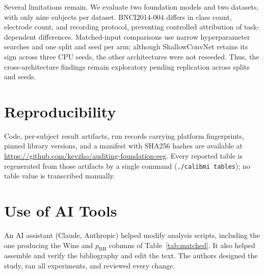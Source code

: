 \documentclass[conference]{IEEEtran}
\begin{document}
Several limitations remain. We evaluate two foundation models and two datasets, with only nine subjects per dataset. BNCI2014-004 differs in class count, electrode count, and recording protocol, preventing controlled attribution of task-dependent differences. Matched-input comparisons use narrow hyperparameter searches and one split and seed per arm; although ShallowConvNet retains its sign across three CPU seeds, the other architectures were not reseeded. Thus, the cross-architecture findings remain exploratory pending replication across splits and seeds.

\section*{Reproducibility}

Code, per-subject result artifacts, run records carrying platform fingerprints, pinned library versions, and a manifest with SHA256 hashes are available at \url{https://github.com/kevzho/auditing-foundation-eeg}. Every reported table is regenerated from those artifacts by a single command (\texttt{./calibmi tables}); no table value is transcribed manually.

\section*{Use of AI Tools}

An AI assistant (Claude, Anthropic) helped modify analysis scripts, including the one producing the Wins and $p_{\mathrm{BH}}$ columns of Table~\ref{tab:matched}. It also helped assemble and verify the bibliography and edit the text. The authors designed the study, ran all experiments, and reviewed every change.



\end{document}
